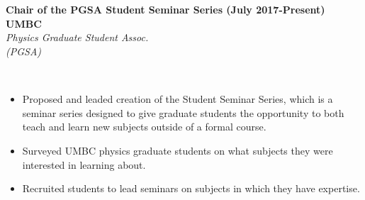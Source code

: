 \documentclass{article}
\begin{document}
\phantom \\
\phantom\\
%
%
%
%
\begin{vwcol}[widths={0.8,0.2}, sep=.8cm, justify=flush, rule=0pt, indent=0em]
\noindent \textbf{Chair of the PGSA Student Seminar Series (July 2017-Present)}
\newpage
\noindent \textbf{UMBC}\\
\noindent \emph{Physics Graduate Student Assoc.}\\
\noindent \emph{(PGSA)}
\end{vwcol}
\phantom \\
\begin{itemize}
\item Proposed and leaded creation of the Student Seminar Series, which is a seminar series designed to give graduate students the opportunity to both teach and learn new subjects outside of a formal course.
\item Surveyed UMBC physics graduate students on what subjects they were interested in learning about.
\item Recruited students to lead seminars on subjects in which they have expertise.
\end{itemize}
\phantom \\
\phantom\\
%
%
%
%
\par
\phantom \\
\phantom \\
\end{document}
